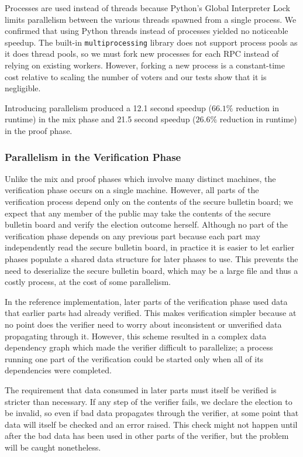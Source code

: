 Processes are used instead of threads because Python's Global Interpreter Lock limits parallelism between the various threads spawned from a single process. We confirmed that using Python threads instead of processes yielded no noticeable speedup. The built-in \texttt{multiprocessing} library does not support process pools as it does thread pools, so we must fork new processes for each RPC instead of relying on existing workers. However, forking a new process is a constant-time cost relative to scaling the number of voters and our tests show that it is negligible.

Introducing parallelism produced a 12.1 second speedup ($66.1\%$ reduction in runtime) in the mix phase and 21.5 second speedup ($26.6\%$ reduction in runtime) in the proof phase.

\subsubsection{Parallelism in the Verification Phase}

Unlike the mix and proof phases which involve many distinct machines, the verification phase occurs on a single machine. However, all parts of the verification process depend only on the contents of the secure bulletin board; we expect that any member of the public may take the contents of the secure bulletin board and verify the election outcome herself. Although no part of the verification phase depends on any previous part because each part may independently read the secure bulletin board, in practice it is easier to let earlier phases populate a shared data structure for later phases to use. This prevents the need to deserialize the secure bulletin board, which may be a large file and thus a costly process, at the cost of some parallelism.

In the reference implementation, later parts of the verification phase used data that earlier parts had already verified. This makes verification simpler because at no point does the verifier need to worry about inconsistent or unverified data propagating through it. However, this scheme resulted in a complex data dependency graph which made the verifier difficult to parallelize; a process running one part of the verification could be started only when all of its dependencies were completed.

The requirement that data consumed in later parts must itself be verified is stricter than necessary. If any step of the verifier fails, we declare the election to be invalid, so even if bad data propagates through the verifier, at some point that data will itself be checked and an error raised. This check might not happen until after the bad data has been used in other parts of the verifier, but the problem will be caught nonetheless.

